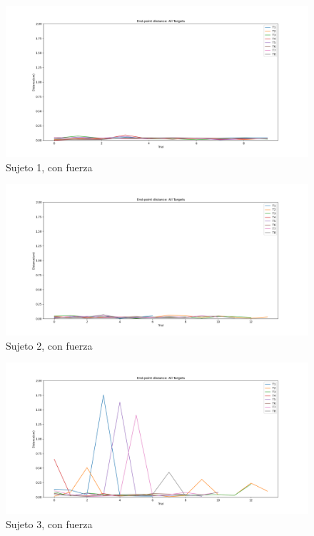 \documentclass[a4paper,11pt, oneside]{book}
\begin{document}
\begin{figure}[H]
	\includegraphics[width=\linewidth]{sujeto1/force/evolution_distance}
	\caption{Sujeto 1, con fuerza}
	\label{1-2-2}
\end{figure}
\begin{figure}[H]
	\includegraphics[width=\linewidth]{sujeto2/force/evolution_distance}
	\caption{Sujeto 2, con fuerza}
	\label{2-2-2}
\end{figure}
\begin{figure}[H]
	\includegraphics[width=\linewidth]{sujeto3/force/evolution_distance}
	\caption{Sujeto 3, con fuerza}
	\label{3-2-2}
\end{figure}
\end{document}
